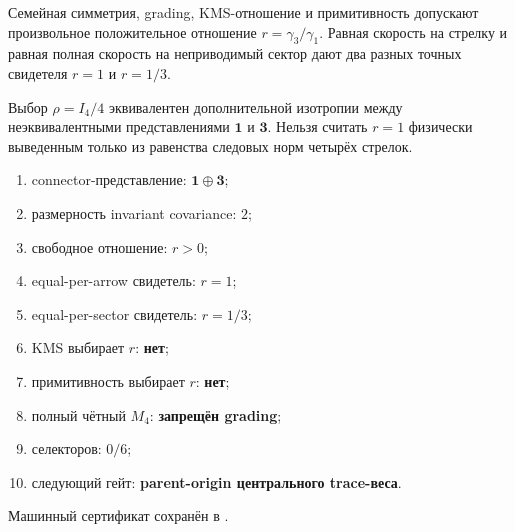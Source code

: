 \begin{theorem}
Семейная симметрия, grading, KMS-отношение и примитивность допускают
произвольное положительное отношение $r=\gamma_3/\gamma_1$. Равная скорость
на стрелку и равная полная скорость на неприводимый сектор дают два разных
точных свидетеля $r=1$ и $r=1/3$.
\end{theorem}

\begin{nogocriterion}
Выбор $\rho=I_4/4$ эквивалентен дополнительной изотропии между
неэквивалентными представлениями $\mathbf1$ и $\mathbf3$. Нельзя считать
$r=1$ физически выведенным только из равенства следовых норм четырёх
стрелок.
\end{nogocriterion}

\begin{protocol}\begin{enumerate}
\item connector-представление: \textbf{$\mathbf1\oplus\mathbf3$};
\item размерность invariant covariance: \textbf{$2$};
\item свободное отношение: \textbf{$r>0$};
\item equal-per-arrow свидетель: \textbf{$r=1$};
\item equal-per-sector свидетель: \textbf{$r=1/3$};
\item KMS выбирает $r$: \textbf{нет};
\item примитивность выбирает $r$: \textbf{нет};
\item полный чётный $M_4$: \textbf{запрещён grading};
\item селекторов: \textbf{$0/6$};
\item следующий гейт: \textbf{parent-origin центрального trace-веса}.
\end{enumerate}\end{protocol}

Машинный сертификат сохранён в
.
